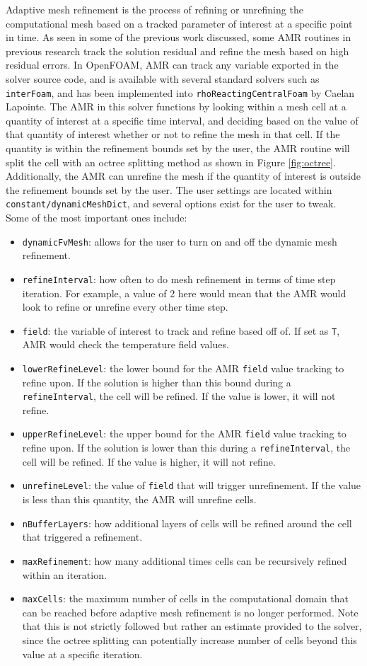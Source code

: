 Adaptive mesh refinement is the process of refining or unrefining the computational mesh based on a tracked parameter of interest at a specific point in time. As seen in some of the previous work discussed, some AMR routines in previous research track the solution residual and refine the mesh based on high residual errors. In OpenFOAM, AMR can track any variable exported in the solver source code, and is available with several standard solvers such as \verb|interFoam|, and has been implemented into \verb|rhoReactingCentralFoam| by Caelan Lapointe. The AMR in this solver functions by looking within a mesh cell at a quantity of interest at a specific time interval, and deciding based on the value of that quantity of interest whether or not to refine the mesh in that cell. If the quantity is within the refinement bounds set by the user, the AMR routine will split the cell with an octree splitting method as shown in Figure \ref{fig:octree}. Additionally, the AMR can unrefine the mesh if the quantity of interest is outside the refinement bounds set by the user. The user settings are located within \verb|constant/dynamicMeshDict|, and several options exist for the user to tweak. Some of the most important ones include:
\begin{itemize}
\item \verb|dynamicFvMesh|: allows for the user to turn on and off the dynamic mesh refinement. 
\item \verb|refineInterval|: how often to do mesh refinement in terms of time step iteration. For example, a value of 2 here would mean that the AMR would look to refine or unrefine every other time step. 
\item \verb|field|: the variable of interest to track and refine based off of. If set as \verb|T|, AMR would check the temperature field values.  
\item \verb|lowerRefineLevel|: the lower bound for the AMR \verb|field| value tracking to refine upon. If the solution is higher than this bound during a \verb|refineInterval|, the cell will be refined. If the value is lower, it will not refine. 
\item \verb|upperRefineLevel|: the upper bound for the AMR \verb|field| value tracking to refine upon. If the solution is lower than this during a \verb|refineInterval|, the cell will be refined. If the value is higher, it will not refine. 
\item \verb|unrefineLevel|: the value of \verb|field| that will trigger unrefinement. If the value is less than this quantity, the AMR will unrefine cells. 
\item \verb|nBufferLayers|: how additional layers of cells will be refined around the cell that triggered a refinement. 
\item \verb|maxRefinement|: how many additional times cells can be recursively refined within an iteration. 
\item \verb|maxCells|: the maximum number of cells in the computational domain that can be reached before adaptive mesh refinement is no longer performed. Note that this is not strictly followed but rather an estimate provided to the solver, since the octree splitting can potentially increase number of cells beyond this value at a specific iteration.
\end{itemize}
